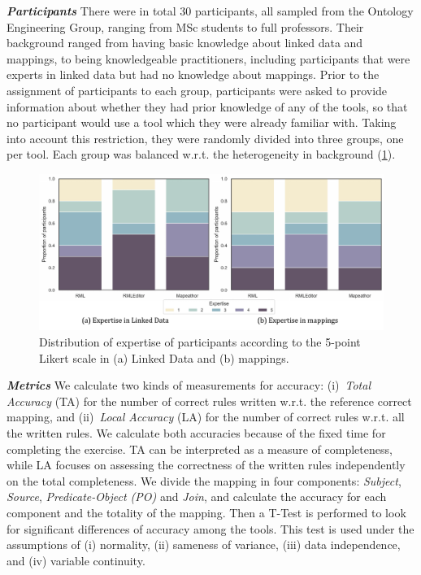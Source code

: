 \noindent\textit{\textbf{Participants}} 
There were in total 30 participants, all sampled from the Ontology Engineering Group, ranging from MSc students to full professors. Their background ranged from having basic knowledge about linked data and mappings, to being knowledgeable practitioners, including participants that were experts in linked data but had no knowledge about mappings. Prior to the assignment of participants to each group, participants were asked to provide information about whether they had prior knowledge of any of the tools, so that no participant would use a tool which they were already familiar with. Taking into account this restriction, they were randomly divided into three groups, one per tool. Each group was balanced w.r.t. the heterogeneity in background (\cref{fig:chp5-1_expertise}). 


\begin{figure}[!t]
\centering
\includegraphics[width=1\linewidth]{figures/chp5-1_expertise.pdf}
\caption[Expertise of participants of the user study]{Distribution of expertise of participants according to the 5-point Likert scale in (a) Linked Data and (b) mappings.}
\label{fig:chp5-1_expertise}
\end{figure}

\noindent\textit{\textbf{Metrics}} 
We calculate two kinds of measurements for accuracy: (i)~\textit{Total Accuracy} (TA) for the number of correct rules written w.r.t. the reference correct mapping, and (ii)~\textit{Local Accuracy} (LA) for the number of correct rules w.r.t. all the written rules. We calculate both accuracies because of the fixed time for completing the exercise. TA can be interpreted as a measure of completeness, while LA focuses on assessing the correctness of the written rules independently on the total completeness.
We divide the mapping in four components: \textit{Subject}, \textit{Source}, \textit{Predicate-Object (PO)} and \textit{Join}, and calculate the accuracy for each component and the totality of the mapping. Then a T-Test is performed to look for significant differences of accuracy among the tools. This test is used under the assumptions of (i) normality, (ii) sameness of variance, (iii) data independence, and (iv) variable continuity.


